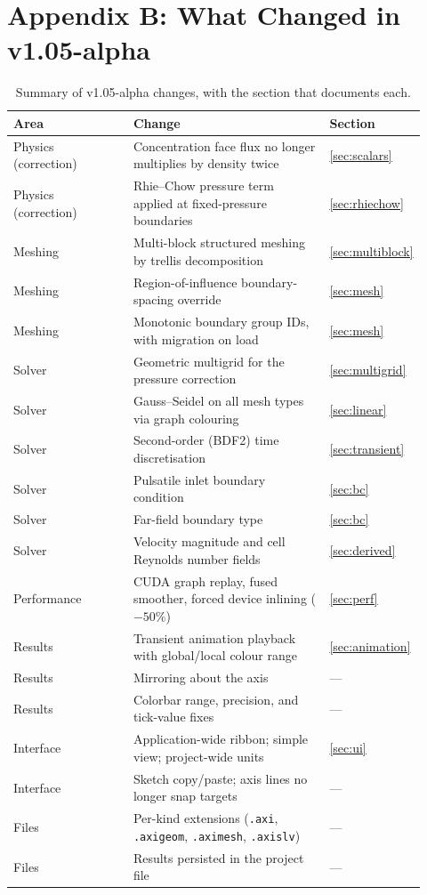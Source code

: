 \documentclass[11pt]{article}
\begin{document}
\section*{Appendix B: What Changed in v1.05-alpha}
\begin{table}[h]
\centering
\caption{Summary of v1.05-alpha changes, with the section that documents each.}
\begin{tabular}{@{}>{\raggedright\arraybackslash}p{0.30\linewidth}
                   >{\raggedright\arraybackslash}p{0.50\linewidth}
                   >{\raggedright\arraybackslash}p{0.12\linewidth}@{}}
\toprule
\textbf{Area} & \textbf{Change} & \textbf{Section} \\
\midrule
Physics (correction) & Concentration face flux no longer multiplies by density twice & \ref{sec:scalars} \\
Physics (correction) & Rhie--Chow pressure term applied at fixed-pressure boundaries & \ref{sec:rhiechow} \\
Meshing & Multi-block structured meshing by trellis decomposition & \ref{sec:multiblock} \\
Meshing & Region-of-influence boundary-spacing override & \ref{sec:mesh} \\
Meshing & Monotonic boundary group IDs, with migration on load & \ref{sec:mesh} \\
Solver & Geometric multigrid for the pressure correction & \ref{sec:multigrid} \\
Solver & Gauss--Seidel on all mesh types via graph colouring & \ref{sec:linear} \\
Solver & Second-order (BDF2) time discretisation & \ref{sec:transient} \\
Solver & Pulsatile inlet boundary condition & \ref{sec:bc} \\
Solver & Far-field boundary type & \ref{sec:bc} \\
Solver & Velocity magnitude and cell Reynolds number fields & \ref{sec:derived} \\
Performance & CUDA graph replay, fused smoother, forced device inlining ($-50\%$) & \ref{sec:perf} \\
Results & Transient animation playback with global/local colour range & \ref{sec:animation} \\
Results & Mirroring about the axis & --- \\
Results & Colorbar range, precision, and tick-value fixes & --- \\
Interface & Application-wide ribbon; simple view; project-wide units & \ref{sec:ui} \\
Interface & Sketch copy/paste; axis lines no longer snap targets & --- \\
Files & Per-kind extensions (\texttt{.axi}, \texttt{.axigeom}, \texttt{.aximesh}, \texttt{.axislv}) & --- \\
Files & Results persisted in the project file & --- \\
\bottomrule
\end{tabular}
\end{table}
\end{document}
